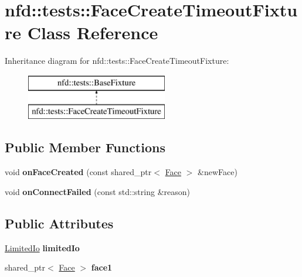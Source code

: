 \hypertarget{classnfd_1_1tests_1_1FaceCreateTimeoutFixture}{}\section{nfd\+:\+:tests\+:\+:Face\+Create\+Timeout\+Fixture Class Reference}
\label{classnfd_1_1tests_1_1FaceCreateTimeoutFixture}
Inheritance diagram for nfd\+:\+:tests\+:\+:Face\+Create\+Timeout\+Fixture\+:\begin{figure}[H]
\begin{center}
\leavevmode
\includegraphics[height=2.000000cm]{classnfd_1_1tests_1_1FaceCreateTimeoutFixture}
\end{center}
\end{figure}
\subsection*{Public Member Functions}
\begin{DoxyCompactItemize}
\item 
void {\bfseries on\+Face\+Created} (const shared\+\_\+ptr$<$ \hyperlink{classnfd_1_1Face}{Face} $>$ \&new\+Face)\hypertarget{classnfd_1_1tests_1_1FaceCreateTimeoutFixture_a9051e2fefc23d0c2e0515803db116a8d}{}\label{classnfd_1_1tests_1_1FaceCreateTimeoutFixture_a9051e2fefc23d0c2e0515803db116a8d}

\item 
void {\bfseries on\+Connect\+Failed} (const std\+::string \&reason)\hypertarget{classnfd_1_1tests_1_1FaceCreateTimeoutFixture_aa36c4c9d5716897f8c7b257589b88bf0}{}\label{classnfd_1_1tests_1_1FaceCreateTimeoutFixture_aa36c4c9d5716897f8c7b257589b88bf0}

\end{DoxyCompactItemize}
\subsection*{Public Attributes}
\begin{DoxyCompactItemize}
\item 
\hyperlink{classnfd_1_1tests_1_1LimitedIo}{Limited\+Io} {\bfseries limited\+Io}\hypertarget{classnfd_1_1tests_1_1FaceCreateTimeoutFixture_a9819f7f847f1b526048496cca301ddca}{}\label{classnfd_1_1tests_1_1FaceCreateTimeoutFixture_a9819f7f847f1b526048496cca301ddca}

\item 
shared\+\_\+ptr$<$ \hyperlink{classnfd_1_1Face}{Face} $>$ {\bfseries face1}\hypertarget{classnfd_1_1tests_1_1FaceCreateTimeoutFixture_a2a1b0accaabb888c225e2b27844ea20c}{}\label{classnfd_1_1tests_1_1FaceCreateTimeoutFixture_a2a1b0accaabb888c225e2b27844ea20c}

\end{DoxyCompactItemize}
